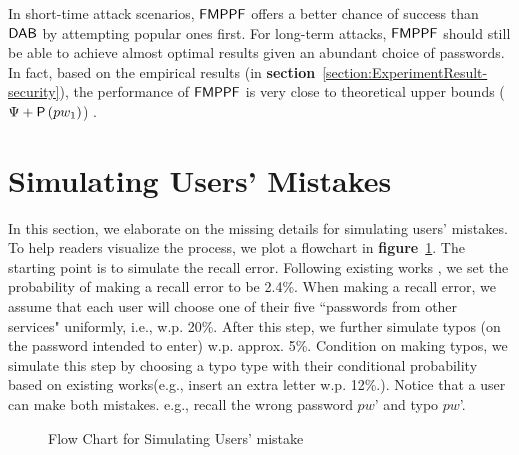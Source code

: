 In short-time attack scenarios, $\mathsf{FMPPF}$ offers a better chance of success than $\mathsf{DAB}$ by attempting popular ones first. For long-term attacks, $\mathsf{FMPPF}$ should still be able to achieve almost optimal results given an abundant choice of passwords.  In fact, based on the empirical results (in \textbf{section}~\ref{section:ExperimentResult-security}), the performance of $\mathsf{FMPPF}$ is very close to theoretical upper bounds ($\Psi + \mathsf{P}\left(pw_1\right)$) . %



\vspace{-0.1in}
\section{Simulating Users' Mistakes}\label{appendix:simulateMistakes}
In this section, we elaborate on the missing details for simulating users' mistakes. To help readers visualize the process, we plot a flowchart in \textbf{figure}~\ref{figure:flowChartTypo}. The starting point is to simulate the recall error. Following existing works \cite{CCS:CWPCR17,SP:CAAJR16}, we set the probability of making a recall error to be 2.4\%. When making a recall error, we assume that each user will choose one of their five ``passwords from other services" uniformly, i.e., w.p. 20\%. After this step, we further simulate typos (on the password intended to enter) w.p. approx. 5\%. Condition on making typos, we simulate this step by choosing a typo type with their conditional probability based on existing works\cite{CCS:CWPCR17,SP:CAAJR16}(e.g., insert an extra letter w.p. 12\%.). Notice that a user can make both mistakes. e.g., recall the wrong password $pw$' and typo $pw$'.

\begin{figure}
	
	\vspace{-0.2in}
	\caption{Flow Chart for Simulating Users' mistake}\label{figure:flowChartTypo}
\end{figure}

